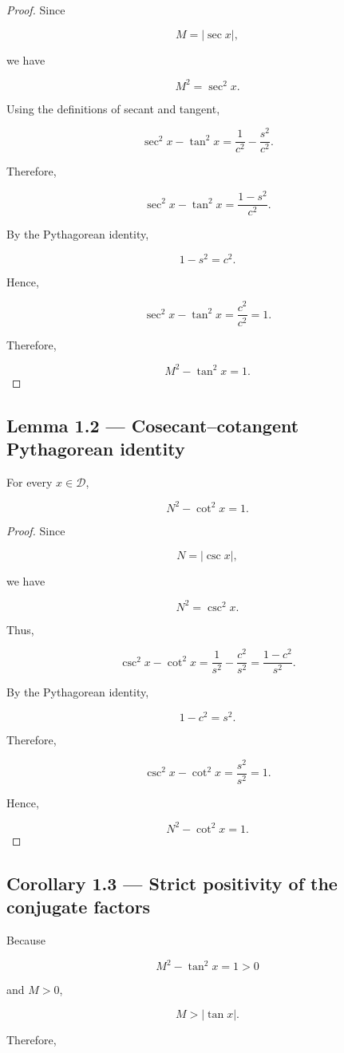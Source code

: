 \documentclass[11pt,oneside,openany]{book}
\newcommand{\PCsubsection}[1]{%
  \subsection*{#1}%
}
\begin{document}
\begin{proof}
Since

\[
M=|\sec x|,
\]

we have

\[
M^2=\sec ^2x.
\]

Using the definitions of secant and tangent,

\[
\sec ^2x-\tan ^2x = \frac1{c^2}-\frac{s^2}{c^2}.
\]

Therefore,

\[
\sec ^2x-\tan ^2x = \frac{1-s^2}{c^2}.
\]

By the Pythagorean identity,

\[
1-s^2=c^2.
\]

Hence,

\[
\sec ^2x-\tan ^2x = \frac{c^2}{c^2} = 1.
\]

Therefore,

\[
\boxed{M^2-\tan ^2x=1}.
\]

\end{proof}

\PCsubsection{Lemma 1.2 --- Cosecant–cotangent Pythagorean identity}

For every \(x\in\mathcal D\),

\[
\boxed{N^2-\cot ^2x=1}.
\]

\begin{proof}
Since

\[
N=|\csc x|,
\]

we have

\[
N^2=\csc ^2x.
\]

Thus,

\[
\csc ^2x-\cot ^2x = \frac1{s^2}-\frac{c^2}{s^2} = \frac{1-c^2}{s^2}.
\]

By the Pythagorean identity,

\[
1-c^2=s^2.
\]

Therefore,

\[
\csc ^2x-\cot ^2x = \frac{s^2}{s^2} = 1.
\]

Hence,

\[
\boxed{N^2-\cot ^2x=1}.
\]

\end{proof}

\PCsubsection{Corollary 1.3 --- Strict positivity of the conjugate factors}

Because

\[
M^2-\tan ^2x=1>0
\]

and \(M>0\),

\[
M>|\tan x|.
\]

Therefore,
\end{document}
